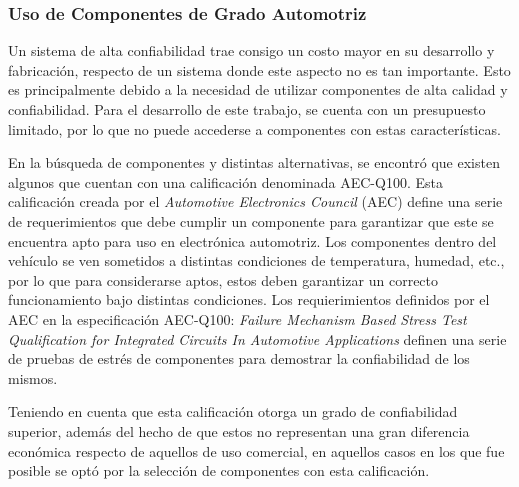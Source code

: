 \subsubsection{Uso de Componentes de Grado Automotriz}

Un sistema de alta confiabilidad trae consigo un costo mayor en su desarrollo y fabricación, respecto de un sistema donde este aspecto no es tan importante. Esto es principalmente debido a la necesidad de utilizar componentes de alta calidad y confiabilidad. Para el desarrollo de este trabajo, se cuenta con un presupuesto limitado, por lo que no puede accederse a componentes con estas características.

En la búsqueda de componentes y distintas alternativas, se encontró que existen algunos que cuentan con una calificación denominada AEC-Q100. Esta calificación creada por el \textit{Automotive Electronics Council} (AEC) define una serie de requerimientos que debe cumplir un componente para garantizar que este se encuentra apto para uso en electrónica automotriz. 
Los componentes dentro del vehículo se ven sometidos a distintas condiciones de temperatura, humedad, etc., por lo que para considerarse aptos, estos deben garantizar un correcto funcionamiento bajo distintas condiciones. Los requierimientos definidos por el AEC en la especificación AEC-Q100: \textit{Failure Mechanism Based Stress Test Qualification for Integrated Circuits In Automotive Applications} definen una serie de pruebas de estrés de componentes para demostrar la confiabilidad de los mismos.

Teniendo en cuenta que esta calificación otorga un grado de confiabilidad superior, además del hecho de que estos no representan una gran diferencia económica respecto de aquellos de uso comercial, en aquellos casos en los que fue posible se optó por la selección de componentes con esta calificación.









